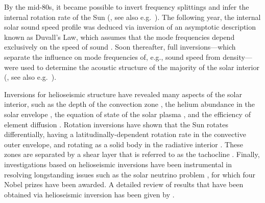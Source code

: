 By the mid-80s, it became possible to invert frequency splittings and infer the internal rotation rate of the Sun (\citealt{1984Natur.310...22D}, see also e.g.~\citealt{1998ApJ...505..390S, 2009LRSP....6....1H}). 
The following year, the internal solar sound speed profile was deduced via inversion of an asymptotic description known as Duvall's Law, which assumes that the mode frequencies depend exclusively on the speed of sound \citep{1985Natur.315..378C}. 
Soon thereafter, full inversions---which separate the influence on mode frequencies of, e.g., sound speed from density---were used to determine the acoustic structure of the majority of the solar interior (\citealt{1985SoPh..100...65G}, see also e.g.~\citealt{1990MNRAS.244..542D, GoughThompson1991, 1991ARA&A..29..627G, 1994a&as..107..421a, 2009ApJ...699.1403B}). 

Inversions for helioseismic structure have revealed many aspects of the solar interior, such as the depth of the convection zone \citep[e.g.,][]{1991ApJ...378..413C, 1997MNRAS.287..189B}, the helium abundance in the solar envelope \citep[e.g.,][]{1991LNP...388..111D, 1998MNRAS.298..719B}, the equation of state of the solar plasma \citep{1997A&A...322L...5B}, %
and the efficiency of element diffusion \citep{1993ApJ...403L..75C}. 
Rotation inversions have shown that the Sun rotates differentially, having a latitudinally-dependent rotation rate in the convective outer envelope, and rotating as a solid body in the radiative interior \citep[e.g.,][]{2009LRSP....6....1H}. 
These zones are separated by a shear layer that is referred to as the tachocline \citep[][]{1992A&A...265..106S}. 
Finally, investigations based on helioseismic inversions have been instrumental in resolving longstanding issues such as the solar neutrino problem \citep[e.g.,][]{1998PhLB..433....1B}, for which four Nobel prizes have been awarded. 
A detailed review of results that have been obtained via helioseismic inversion has been given by \citet{2016lrsp...13....2b}. 





